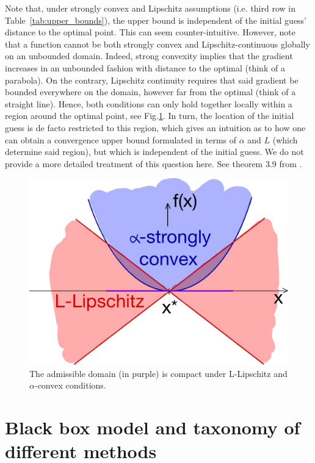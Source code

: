 \documentclass{article}
\begin{document}
Note that, under strongly convex and Lipschitz assumptions (i.e. third row in Table~\ref{tab:upper_bounds}), the upper bound is independent of the initial guess' distance to the optimal point. This can seem counter-intuitive. However, note that a function cannot be both strongly convex and Lipschitz-continuous globally on an unbounded domain. Indeed, strong convexity implies that the gradient increases in an unbounded fashion with distance to the optimal (think of a parabola). On the contrary, Lipschitz continuity requires that said gradient be bounded everywhere on the domain, however far from the optimal (think of a straight line). Hence, both conditions can only hold together locally within a region around the optimal point, see Fig.\ref{fig:l_lipschitz_alpha_conv}. In turn, the location of the initial guess is de facto restricted to this region, which gives an intuition as to how one can obtain a convergence upper bound formulated in terms of $\alpha$ and $L$ (which determine said region), but which is independent of the initial guess. We do not provide a more detailed treatment of this question here. See theorem 3.9 from \cite{bubeck}.

\begin{figure}[h]
    \centering
    \includegraphics[scale=0.15]{img/L_Lipschitz_alpha_convex.pdf}
    \caption{The admissible domain (in purple) is compact under L-Lipschitz and $\alpha$-convex  conditions.\label{fig:l_lipschitz_alpha_conv}}
\end{figure}

\section{Black box model and taxonomy of different methods}
\label{blackbox}
\end{document}
